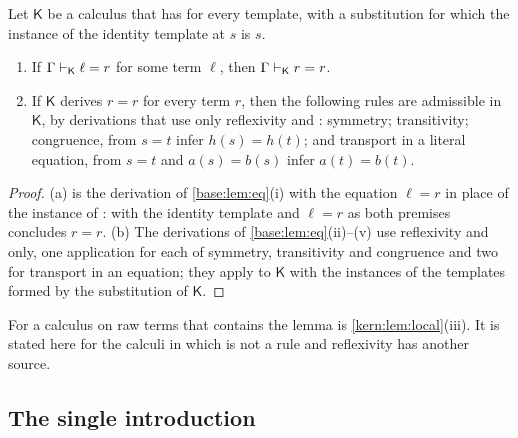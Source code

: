\begin{lemma}
\label{comp:lem:eqalg}
Let $\mathsf{K}$ be a calculus that has  for every template,
with a substitution for which the instance of the identity template at $s$
is $s$.
\begin{enumerate}[label=(\alph*)]
\item If $\Gamma\vdash_{\mathsf K}\ell=r$ for some term $\ell$, then
 $\Gamma\vdash_{\mathsf K}r=r$.
\item If $\mathsf{K}$ derives $r=r$ for every term $r$, then the following
 rules are admissible in $\mathsf{K}$, by derivations that use only
 reflexivity and : symmetry; transitivity; congruence, from
 $s=t$ infer $h(s)=h(t)$; and transport in a literal equation, from $s=t$
 and $a(s)=b(s)$ infer $a(t)=b(t)$.
\end{enumerate}
\end{lemma}

\begin{proof}
(a) is the derivation of \cref{base:lem:eq}(i) with the equation $\ell=r$
in place of the instance of :  with the identity
template and $\ell=r$ as both premises concludes $r=r$. (b) The derivations
of \cref{base:lem:eq}(ii)--(v) use reflexivity and  only, one
application for each of symmetry, transitivity and congruence and two for
transport in an equation; they apply to $\mathsf{K}$ with the instances of
the templates formed by the substitution of $\mathsf{K}$.
\end{proof}

For a calculus on raw terms that contains  the lemma is
\cref{kern:lem:local}(iii). It is stated here for the calculi in which
 is not a rule and reflexivity has another source.

\subsection{The single introduction}

